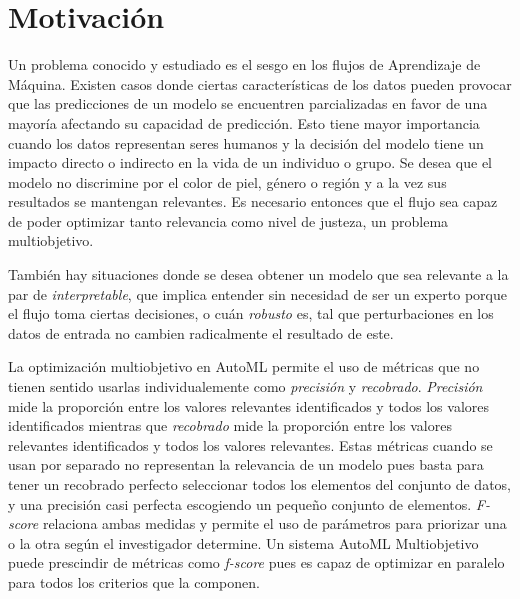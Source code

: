 \section*{Motivaci\'on}
Un problema conocido y estudiado es el sesgo en los flujos de Aprendizaje de M\'aquina. Existen casos donde ciertas caracter\'isticas de los datos pueden provocar que las predicciones de un modelo se encuentren parcializadas en favor de una mayor\'ia   afectando su capacidad de predicci\'on. Esto tiene mayor importancia cuando los datos representan seres humanos y la decisi\'on del modelo tiene un impacto directo o indirecto en la vida de un individuo o grupo. Se desea que el modelo no discrimine por el color de piel, g\'enero o regi\'on y a la vez sus resultados se mantengan relevantes. Es necesario entonces que el flujo sea capaz de poder optimizar tanto  relevancia como  nivel de justeza, un problema multiobjetivo.

Tambi\'en hay situaciones donde se desea obtener un modelo que sea relevante a la par de \textit{interpretable}, que implica entender sin necesidad de ser un experto porque el flujo toma ciertas decisiones, o cu\'an \textit{robusto} es, tal que perturbaciones en los datos de entrada no cambien radicalmente el resultado de este.

La optimizaci\'on multiobjetivo en AutoML permite el uso de m\'etricas que no tienen sentido usarlas individualemente como \textit{precisi\'on} y \textit{recobrado}. 
 \textit{Precisi\'on} mide la proporci\'on entre los valores relevantes identificados y todos los valores identificados
 mientras que \textit{recobrado} mide la proporci\'on entre los valores relevantes identificados y todos los valores relevantes.
Estas m\'etricas cuando se usan por separado no representan la relevancia de un modelo pues basta para tener un recobrado perfecto seleccionar todos los elementos del conjunto de datos, y una precisi\'on casi perfecta escogiendo un pequeño conjunto de elementos.
\textit{F-score} relaciona ambas medidas y permite el uso de  par\'ametros para priorizar una o la otra seg\'un el investigador determine. 
Un sistema AutoML Multiobjetivo puede prescindir de m\'etricas como \textit{f-score} pues es capaz de optimizar en paralelo para todos los criterios que la componen.


